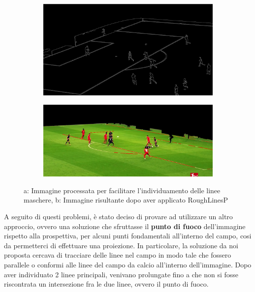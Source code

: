 \documentclass{article}
\begin{document}
\begin{figure}[h]
    \centering
    \begin{subfigure}{0.33\textwidth}
        \includegraphics[width=\linewidth]{capitoli/cannyimage.jpeg}
        \subcaption{}
    \end{subfigure}
    \begin{subfigure}{0.40\textwidth}
        \includegraphics[width=\linewidth]{capitoli/roughlines.jpeg}
        \subcaption{}
    \end{subfigure}
    \caption{a: Immagine processata per facilitare l'individuamento delle linee maschere, b: Immagine risultante dopo aver applicato RoughLinesP}
    \label{fig:foobar}
\end{figure}

A seguito di questi problemi, è stato deciso di provare ad utilizzare un altro approccio, ovvero una soluzione che sfruttasse il \textbf{punto di fuoco} dell'immagine rispetto alla prospettiva, per alcuni punti fondamentali all'interno del campo, cosi da permetterci di effettuare una proiezione. 
In particolare, la soluzione da noi proposta cercava di tracciare delle linee nel campo in modo tale che fossero parallele o conformi alle linee del campo da calcio all'interno dell'immagine. Dopo aver individuato 2 linee principali, venivano prolungate fino a che non si fosse riscontrata un intersezione fra le due linee, ovvero il punto di fuoco.
\end{document}
